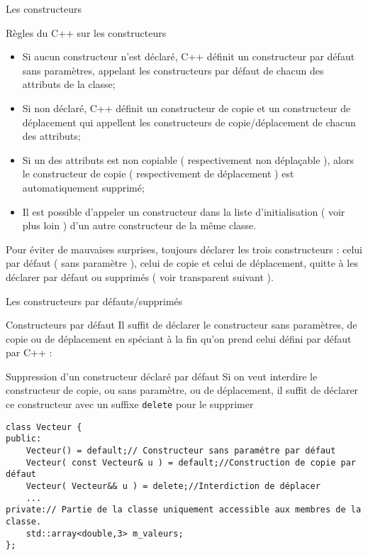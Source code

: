 \documentclass[handout,10pt]{beamer}
\begin{document}
\begin{frame}[fragile]{Les constructeurs}
\tiny
\begin{block}{Règles du C++ sur les constructeurs}
\begin{itemize}
\item Si aucun constructeur n'est déclaré, C++ définit un constructeur par défaut sans paramètres, appelant les constructeurs
par défaut de chacun des attributs de la classe;
\item Si non déclaré, C++ définit un constructeur de copie et un constructeur de déplacement qui appellent les constructeurs de copie/déplacement de chacun des attributs;
\item Si un des attributs est non copiable ( respectivement non déplaçable ), alors le constructeur de copie ( respectivement de déplacement )
est automatiquement supprimé;
\item Il est possible d'appeler un constructeur dans la liste d'initialisation ( voir plus loin ) d'un autre constructeur de la même classe.
\end{itemize}
\alert{Pour éviter de mauvaises surprises, toujours déclarer les trois constructeurs : celui par défaut ( sans paramètre ), celui de copie et celui de déplacement, quitte à les déclarer par défaut ou supprimés ( voir transparent suivant ).}
\end{block}
\end{frame}

\begin{frame}[fragile]{Les constructeurs par défauts/supprimés}
\begin{block}{Constructeurs par défaut}
Il suffit de déclarer le constructeur sans paramètres, de copie ou de déplacement en spéciant à la fin qu'on prend celui
défini par défaut par C++ :
\end{block}
\begin{block}{Suppression d'un constructeur déclaré par défaut}
Si on veut interdire le constructeur de copie, ou sans paramètre, ou de déplacement, il suffit de déclarer ce constructeur
avec un suffixe \lstinline{delete} pour le supprimer
\end{block}

\begin{lstlisting}
class Vecteur {
public:
    Vecteur() = default;// Constructeur sans paramétre par défaut
    Vecteur( const Vecteur& u ) = default;//Construction de copie par défaut
    Vecteur( Vecteur&& u ) = delete;//Interdiction de déplacer
    ...
private:// Partie de la classe uniquement accessible aux membres de la classe.
    std::array<double,3> m_valeurs;
};
\end{lstlisting}
\end{frame}
\end{document}
